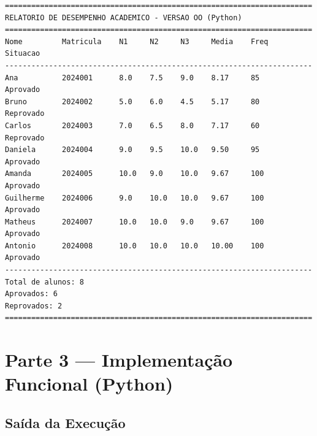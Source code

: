 \documentclass[12pt, a4paper]{article}
\begin{document}
\begin{lstlisting}[style=output]
======================================================================
RELATORIO DE DESEMPENHO ACADEMICO - VERSAO OO (Python)
======================================================================
Nome         Matricula    N1     N2     N3     Media    Freq   Situacao
----------------------------------------------------------------------
Ana          2024001      8.0    7.5    9.0    8.17     85     Aprovado
Bruno        2024002      5.0    6.0    4.5    5.17     80     Reprovado
Carlos       2024003      7.0    6.5    8.0    7.17     60     Reprovado
Daniela      2024004      9.0    9.5    10.0   9.50     95     Aprovado
Amanda       2024005      10.0   9.0    10.0   9.67     100    Aprovado
Guilherme    2024006      9.0    10.0   10.0   9.67     100    Aprovado
Matheus      2024007      10.0   10.0   9.0    9.67     100    Aprovado
Antonio      2024008      10.0   10.0   10.0   10.00    100    Aprovado
----------------------------------------------------------------------
Total de alunos: 8
Aprovados: 6
Reprovados: 2
======================================================================
\end{lstlisting}

\section{Parte 3 --- Implementação Funcional (Python)}



\subsection{Saída da Execução}
\end{document}
